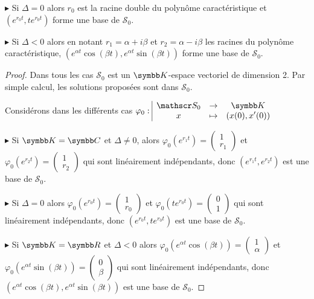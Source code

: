 $\blacktriangleright$ Si $\Delta = 0$ alors $r_0$ est la racine double du polynôme caractéristique et $(e^{r_0 t}, te^{r_0 t})$ forme une base de $\mathscr S_0$.

$\blacktriangleright$ Si $\Delta < 0$ alors en notant $r_1 = \alpha + i \beta$ et $r_2 = \alpha - i \beta$ les racines du polynôme caractéristique, $(e^{\alpha t} \cos (\beta t), e^{\alpha t} \sin (\beta t))$ forme une base de $\mathscr S_0$.


\begin{proof}
    Dans tous les cas $\mathscr S_0$ est un $\K$-espace vectoriel de dimension 2. 
    Par simple calcul, les solutions proposées sont dans $\mathscr S_0$. 

    Considérons dans les différents cas $\fonction{\varphi_0}{\mathscr S_0}{\K}{x}{(x(0), x'(0))}$ 
    
    $\blacktriangleright$ Si $\K = \C$ et $\Delta \neq 0$, alors $\varphi_0(e^{r_1 t}) = \begin{pmatrix}
        1 \\ r_1
    \end{pmatrix}$ et $\varphi_0(e^{r_2 t}) = \begin{pmatrix}
        1 \\ r_2
    \end{pmatrix}$ qui sont linéairement indépendants, donc $(e^{r_1 t}, e^{r_2 t})$ est une base de $\mathscr S_0$.

    \avspace $\blacktriangleright$ Si $\Delta = 0$ alors $\varphi_0(e^{r_0 t}) = \begin{pmatrix}
        1 \\ r_0
    \end{pmatrix}$ et $\varphi_0(te^{r_0 t}) = \begin{pmatrix}
        0 \\ 1
    \end{pmatrix}$ qui sont linéairement indépendants, donc $(e^{r_0 t}, te^{r_0 t})$ est une base de $\mathscr S_0$.

    \avspace $\blacktriangleright$ Si $\K = \R$ et $\Delta < 0$ alors $\varphi_0(e^{\alpha t} \cos (\beta t)) = \begin{pmatrix}
        1 \\ \alpha
    \end{pmatrix}$ et $\varphi_0(e^{\alpha t} \sin (\beta t)) = \begin{pmatrix}
        0 \\ \beta
    \end{pmatrix}$ qui sont linéairement indépendants, donc $(e^{\alpha t} \cos (\beta t), e^{\alpha t} \sin (\beta t))$ est une base de $\mathscr S_0$.
\end{proof}


